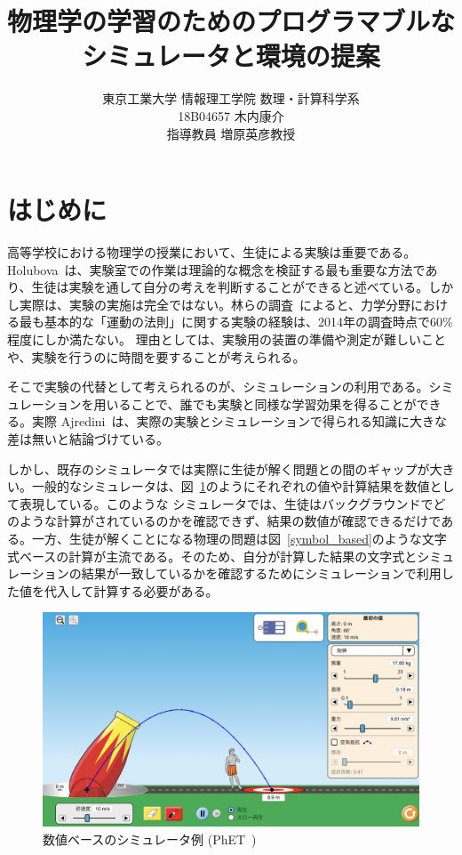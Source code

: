 \documentclass[11pt, a4paper, oneside, twocolumn]{jsarticle}
\title{物理学の学習のためのプログラマブルな
\\シミュレータと環境の提案}
\author{東京工業大学 情報理工学院 数理・計算科学系\\18B04657 木内康介\\指導教員 増原英彦教授}
\date{}
\begin{document}
\maketitle

\section{はじめに} \label{intro}
高等学校における物理学の授業において、生徒による実験は重要である。Holubova~\cite{holubova_2019}は、実験室での作業は理論的な概念を検証する最も重要な方法であり、生徒は実験を通して自分の考えを判断することができると述べている。しかし実際は、実験の実施は完全ではない。林らの調査~\cite{2015KJ00010038066}によると、力学分野における最も基本的な「運動の法則」に関する実験の経験は、2014年の調査時点で60\%程度にしか満たない。
理由としては、実験用の装置の準備や測定が難しいことや、実験を行うのに時間を要することが考えられる。

そこで実験の代替として考えられるのが、シミュレーションの利用である。シミュレーションを用いることで、誰でも実験と同様な学習効果を得ることができる。実際 Ajredini~\cite{ajredini_real_2014}は、実際の実験とシミュレーションで得られる知識に大きな差は無いと結論づけている。

しかし、既存のシミュレータでは実際に生徒が解く問題との間のギャップが大きい。一般的なシミュレータは、図~\ref{numeral_based}のようにそれぞれの値や計算結果を数値として表現している。このような
シミュレータでは、生徒はバックグラウンドでどのような計算がされているのかを確認できず、結果の数値が確認できるだけである。一方、生徒が解くことになる物理の問題は図~\ref{symbol_based}のような文字式ベースの計算が主流である。そのため、自分が計算した結果の文字式とシミュレーションの結果が一致しているかを確認するためにシミュレーションで利用した値を代入して計算する必要がある。

\begin{figure}[hbt]
\centering
\includegraphics*[width=0.9\linewidth]{figure/PhET_example.png}
\caption{数値ベースのシミュレータ例 (PhET~\cite{perkins_phet_2006})} \label{numeral_based}
\end{figure}
\end{document}
